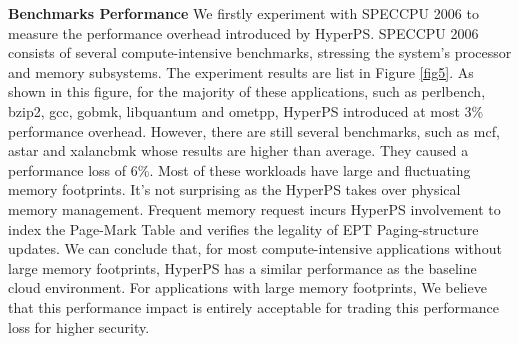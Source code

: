 \textbf{Benchmarks Performance}
We firstly experiment with SPECCPU 2006 to measure the performance overhead introduced by HyperPS.
SPECCPU 2006 consists of several compute-intensive benchmarks, stressing the system's processor and memory subsystems. 
The experiment results are list in Figure \ref{fig5}. As shown in this figure, for the majority of these applications, such as perlbench, bzip2, gcc, gobmk, libquantum and ometpp, 
HyperPS introduced at most 3\% performance overhead. 
However, there are still several benchmarks, such as mcf, astar and xalancbmk whose results are higher than average. 
They caused a performance loss of 6\%. 
Most of these workloads have large and fluctuating memory footprints. 
It's not surprising as the HyperPS takes over physical memory management. Frequent memory request incurs HyperPS involvement to index the Page-Mark Table and verifies the legality of EPT Paging-structure updates.
We can conclude that, for most compute-intensive applications without large memory footprints, HyperPS has a similar performance as the baseline cloud environment. 
For applications with large memory footprints, 
We believe that this performance impact is entirely acceptable for trading this performance loss for higher security.




